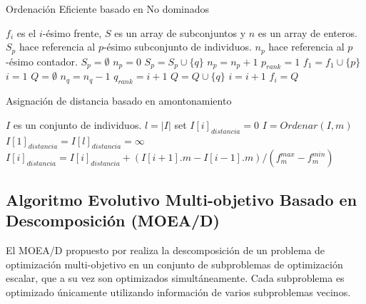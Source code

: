 \begin{algorithm}[H]
   \scriptsize
	\caption{Ordenación Eficiente basado en No dominados} 
	\label{alg:Fast_Non_Dominated_Sort}
	\begin{algorithmic}[1]  
	\STATE $f_i$ es el $i$-ésimo frente, $S$ es un array de subconjuntos y $n$ es un array de enteros.  
	\STATE $S_p$ hace referencia al $p$-ésimo subconjunto de individuos.
	\STATE $n_p$ hace referencia al $p$-ésimo contador.
		\STATE $S_p = \emptyset$
		\STATE $n_p = 0$
				\STATE $S_p = S_p \cup \{q\}$
				\STATE $n_p = n_p + 1$
			\ENDIF
		\ENDFOR
			\STATE $p_{rank} = 1$
			\STATE $f_1 = f_1 \cup \{ p \}$
		\ENDIF
	\ENDFOR
	\STATE $i=1$
		\STATE $Q = \emptyset$
				\STATE $n_q = n_q - 1$
					\STATE $q_{rank} = i+1$
					\STATE $Q = Q \cup \{ q \}$				
				\ENDIF							
			\ENDFOR
		\ENDFOR	
		\STATE $i = i+1$
		\STATE $f_i = Q$
	\ENDWHILE		
	\end{algorithmic}
\end{algorithm}

\begin{algorithm}[H]
\scriptsize
	\caption{Asignación de distancia basado en amontonamiento} 
	\label{alg:Crowdin_Distance_Assignment}
	\begin{algorithmic}[1]
	\STATE $I$ es un conjunto de individuos. 
	\STATE $l = |I|$
		\STATE  set $I[i]_{distancia} = 0$
	\ENDFOR	
		\STATE $I = Ordenar(I,m)$ 
		\STATE $I[1]_{distancia} = I[l]_{distancia} = \infty $ 
			\STATE $ I[i]_{distancia} = I[i]_{distancia} + ( I[i+1].m - I[i-1].m) / ( f_m^{max} - f_m^{min}) $ 
		\ENDFOR
	\ENDFOR
	\end{algorithmic}
\end{algorithm}

\subsection{Algoritmo Evolutivo Multi-objetivo Basado en Descomposición (MOEA/D) }
El MOEA/D propuesto por \cite{Joel:MOEAD} realiza la descomposición de un problema de optimización multi-objetivo en un conjunto de subproblemas de optimización escalar, que a su vez son optimizados simultáneamente.
%
Cada subproblema es optimizado únicamente utilizando información de varios subproblemas vecinos.
%

